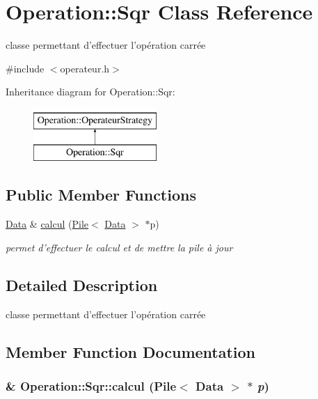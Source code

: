 \hypertarget{classOperation_1_1Sqr}{
\section{Operation::Sqr Class Reference}
\label{classOperation_1_1Sqr}
}


classe permettant d'effectuer l'opération carrée  




{\ttfamily \#include $<$operateur.h$>$}

Inheritance diagram for Operation::Sqr:\begin{figure}[H]
\begin{center}
\leavevmode
\includegraphics[height=2cm]{classOperation_1_1Sqr}
\end{center}
\end{figure}
\subsection*{Public Member Functions}
\begin{DoxyCompactItemize}
\item 
\hyperlink{classNombre_1_1Data}{Data} \& \hyperlink{classOperation_1_1Sqr_ad2aca5d98e570154cb63a8b13d25b8c8}{calcul} (\hyperlink{classPile}{Pile}$<$ \hyperlink{classNombre_1_1Data}{Data} $>$ $\ast$p)
\begin{DoxyCompactList}\small\item\em permet d'effectuer le calcul et de mettre la pile à jour \item\end{DoxyCompactList}\end{DoxyCompactItemize}


\subsection{Detailed Description}
classe permettant d'effectuer l'opération carrée 

\subsection{Member Function Documentation}
\hypertarget{classOperation_1_1Sqr_ad2aca5d98e570154cb63a8b13d25b8c8}{
\subsubsection[{calcul}]{\& Operation::Sqr::calcul ({\bf Pile}$<$ {\bf Data} $>$ $\ast$ {\em p})}}
\label{classOperation_1_1Sqr_ad2aca5d98e570154cb63a8b13d25b8c8}


